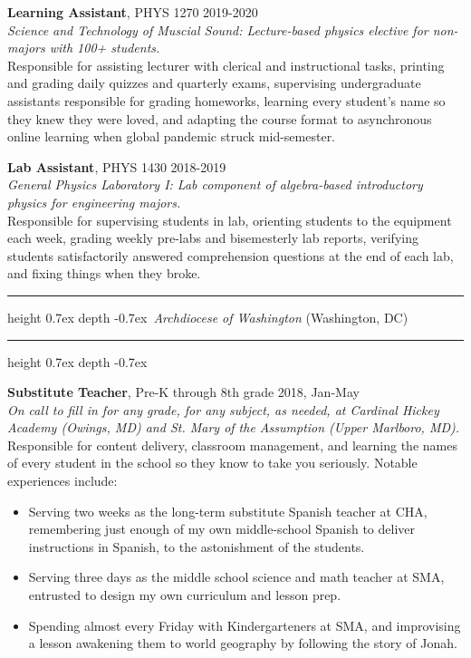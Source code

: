\documentclass[marginmode, 10pt]{res} %
\def\Vhrulefill{\leavevmode\leaders\hrule height 0.7ex depth \dimexpr0.4pt-0.7ex\hfill\kern0pt}         %
\begin{document}
\begin{resume}
\textbf{Learning Assistant}, PHYS 1270 \hfill 2019-2020 \\
\textit{Science and Technology of Muscial Sound: Lecture-based physics elective for non-majors with 100+ students.} \\
Responsible for assisting lecturer with clerical and instructional tasks, printing and grading daily quizzes and quarterly exams, supervising undergraduate assistants responsible for grading homeworks, learning every student's name so they knew they were loved, and adapting the course format to asynchronous online learning when global pandemic struck mid-semester.

\textbf{Lab Assistant}, PHYS 1430 \hfill 2018-2019 \\
\textit{General Physics Laboratory I: Lab component of algebra-based introductory physics for engineering majors.} \\
Responsible for supervising students in lab, orienting students to the equipment each week, grading weekly pre-labs and bisemesterly lab reports, verifying students satisfactorily answered comprehension questions at the end of each lab, and fixing things when they broke.

\Vhrulefill ~\textit{Archdiocese of Washington} (Washington, DC)~ \Vhrulefill

\textbf{Substitute Teacher}, Pre-K through 8th grade \hfill 2018, Jan-May \\
\textit{On call to fill in for any grade, for any subject, as needed, at Cardinal Hickey Academy (Owings, MD) and St. Mary of the Assumption (Upper Marlboro, MD).} \\
Responsible for content delivery, classroom management, and learning the names of every student in the school so they know to take you seriously. Notable experiences include:
\begin{itemize}
    \item Serving two weeks as the long-term substitute Spanish teacher at CHA, remembering just enough of my own middle-school Spanish to deliver instructions in Spanish, to the astonishment of the students.
    \item Serving three days as the middle school science and math teacher at SMA, entrusted to design my own curriculum and lesson prep.
    \item Spending almost every Friday with Kindergarteners at SMA, and improvising a lesson awakening them to world geography by following the story of Jonah.
\end{itemize}



\end{resume}
\end{document}
